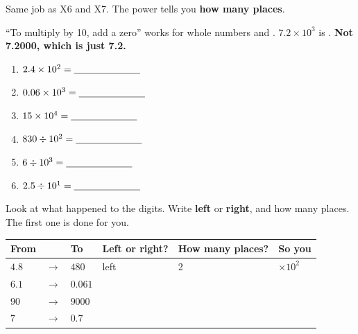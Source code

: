 \documentclass[12pt,a4paper]{article}
\begin{document}

\noindent Same job as X6 and X7. The power tells you \textbf{how many places}.

\begin{remember}
  ``To multiply by 10, add a zero'' works for whole numbers and .
  \; $7.2 \times 10^3$ is . \;
  {\color{cbred}\bfseries Not 7.2000, which is just 7.2.}
\end{remember}

\vspace{2pt}
\begin{multicols}{2}
\begin{enumerate}[label=(\alph*), itemsep=11pt]
  \item $2.4 \times 10^2 = \blank[2.4cm]$
  \item $0.06 \times 10^3 = \blank[2.4cm]$
  \item $15 \times 10^4 = \blank[2.4cm]$
  \item $830 \div 10^2 = \blank[2.4cm]$
  \item $6 \div 10^3 = \blank[2.4cm]$
  \item $2.5 \div 10^1 = \blank[2.4cm]$
\end{enumerate}
\end{multicols}


\noindent Look at what happened to the digits. Write \textbf{left} or \textbf{right},
and how many places. The first one is done for you.

\vspace{4pt}
\noindent
\begin{tabularx}{\textwidth}{|C{2.0cm}|C{0.8cm}|C{2.0cm}|C{2.6cm}|C{2.4cm}|L|}
  \hline
  \textbf{From} & & \textbf{To} & \textbf{Left or right?} & \textbf{How many places?}
  & \textbf{So you} \\
  \hline
  $4.8$ \rule[-0.6em]{0pt}{1.9em} & $\rightarrow$ & $480$ & left & 2 &
    $\times 10^2$ \\ \hline
  $6.1$ \rule[-0.6em]{0pt}{1.9em} & $\rightarrow$ & $0.061$ & & & \\ \hline
  $90$ \rule[-0.6em]{0pt}{1.9em}  & $\rightarrow$ & $9000$ & & & \\ \hline
  $7$ \rule[-0.6em]{0pt}{1.9em}   & $\rightarrow$ & $0.7$ & & & \\ \hline
\end{tabularx}
\end{document}
